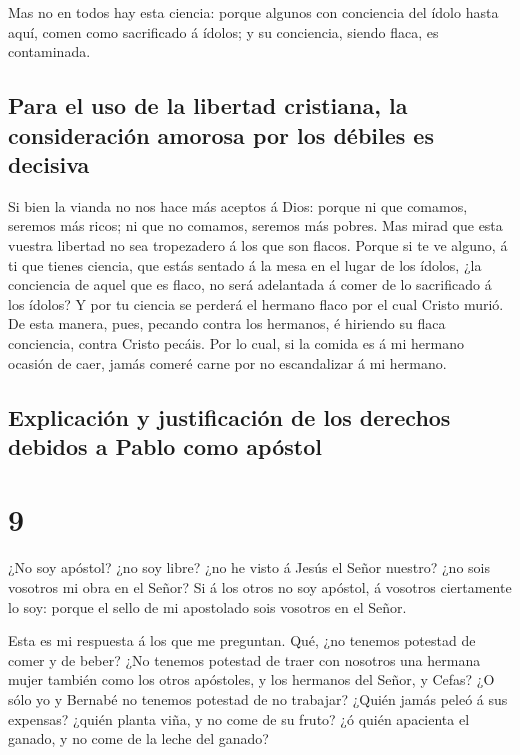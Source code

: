  Mas no en todos hay esta ciencia: porque algunos con
conciencia del ídolo hasta aquí, comen como sacrificado á ídolos; y su
conciencia, siendo flaca, es contaminada.

\hypertarget{para-el-uso-de-la-libertad-cristiana-la-consideraciuxf3n-amorosa-por-los-duxe9biles-es-decisiva}{%
\subsection{Para el uso de la libertad cristiana, la consideración
amorosa por los débiles es
decisiva}\label{para-el-uso-de-la-libertad-cristiana-la-consideraciuxf3n-amorosa-por-los-duxe9biles-es-decisiva}}

 Si bien la vianda no nos hace más aceptos á Dios: porque ni
que comamos, seremos más ricos; ni que no comamos, seremos más pobres.
 Mas mirad que esta vuestra libertad no sea tropezadero á
los que son flacos.  Porque si te ve alguno, á ti que
tienes ciencia, que estás sentado á la mesa en el lugar de los ídolos,
¿la conciencia de aquel que es flaco, no será adelantada á comer de lo
sacrificado á los ídolos?  Y por tu ciencia se perderá el
hermano flaco por el cual Cristo murió.  De esta manera,
pues, pecando contra los hermanos, é hiriendo su flaca conciencia,
contra Cristo pecáis.  Por lo cual, si la comida es á mi
hermano ocasión de caer, jamás comeré carne por no escandalizar á mi
hermano.

\hypertarget{explicaciuxf3n-y-justificaciuxf3n-de-los-derechos-debidos-a-pablo-como-apuxf3stol}{%
\subsection{Explicación y justificación de los derechos debidos a Pablo
como
apóstol}\label{explicaciuxf3n-y-justificaciuxf3n-de-los-derechos-debidos-a-pablo-como-apuxf3stol}}

\hypertarget{section-8}{%
\section{9}\label{section-8}}

 ¿No soy apóstol? ¿no soy libre? ¿no he visto á Jesús el
Señor nuestro? ¿no sois vosotros mi obra en el Señor?  Si á
los otros no soy apóstol, á vosotros ciertamente lo soy: porque el sello
de mi apostolado sois vosotros en el Señor.

 Esta es mi respuesta á los que me preguntan. 
Qué, ¿no tenemos potestad de comer y de beber?  ¿No tenemos
potestad de traer con nosotros una hermana mujer también como los otros
apóstoles, y los hermanos del Señor, y Cefas?  ¿O sólo yo y
Bernabé no tenemos potestad de no trabajar?  ¿Quién jamás
peleó á sus expensas? ¿quién planta viña, y no come de su fruto? ¿ó
quién apacienta el ganado, y no come de la leche del ganado?

